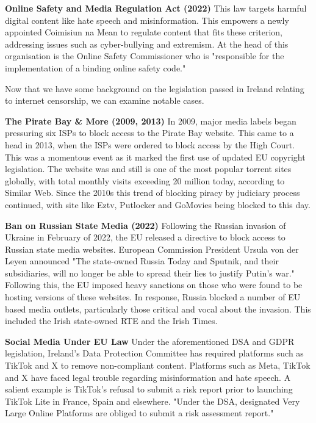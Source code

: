 \textbf{Online Safety and Media Regulation Act (2022)}
This law targets harmful digital content like hate speech and misinformation. This empowers a newly appointed Coimisiun na Mean to regulate content that fits these criterion, addressing issues such as cyber-bullying and extremism. At the head of this organisation is the Online Safety Commissioner who is "responsible for the implementation of a binding online safety code." \cite{onlinesafety2022}

Now that we have some background on the legislation passed in Ireland relating to internet censorship, we can examine notable cases. 

\textbf{The Pirate Bay \& More (2009, 2013)}
In 2009, major media labels began pressuring six ISPs to block access to the Pirate Bay website. This came to a head in 2013, when the ISPs were ordered to block access by the High Court. \cite{piratebay_block2013} This was a momentous event as it marked the first use of updated EU copyright legislation. The website was and still is one of the most popular torrent sites globally, with total monthly visits exceeding 20 million today, according to Similar Web. \cite{piratebay_stats2025} Since the 2010s this trend of blocking piracy by judiciary process continued, with site like Eztv, Putlocker and GoMovies being blocked to this day.

\textbf{Ban on Russian State Media (2022)}
Following the Russian invasion of Ukraine in February of 2022, the EU released a directive \cite{eu_sanctions_russia_media} to block access to Russian state media websites. European Commission President Ursula von der Leyen announced "The state-owned Russia Today and Sputnik, and their subsidiaries, will no longer be able to spread their lies to justify Putin’s war." \cite{rt_ban2022} Following this, the EU imposed heavy sanctions on those who were found to be hosting versions of these websites. In response, Russia blocked a number of EU based media outlets, particularly those critical and vocal about the invasion. This included the Irish state-owned RTE and the Irish Times. \cite{euronews_russia_media_block2024}

\textbf{Social Media Under EU Law}
Under the aforementioned DSA and GDPR legislation, Ireland's Data Protection Committee has required platforms such as TikTok and X to remove non-compliant content. Platforms such as Meta, TikTok and X have faced legal trouble regarding misinformation and hate speech. A salient example is TikTok's refusal to submit a risk report prior to launching TikTok Lite in France, Spain and elsewhere. "Under the DSA, designated Very Large Online Platforms are obliged to submit a risk assessment report." \cite{ec_press_release_2024} 


